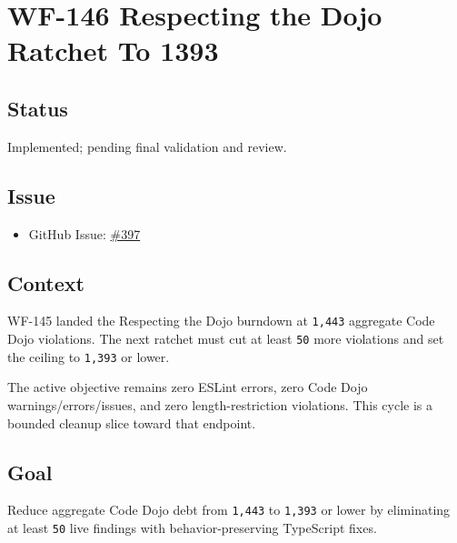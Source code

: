 \chapter{WF-146 Respecting the Dojo Ratchet To 1393}\label{record-228}

\smallskip

\section{Status}\label{record-228-status}

Implemented; pending final validation and review.

\section{Issue}\label{record-228-issue}

\begin{itemize}
\tightlist
\item
  GitHub Issue: \href{https://github.com/flyingrobots/bijou/issues/397}{\#397}
\end{itemize}

\section{Context}\label{record-228-context}

WF-145 landed the Respecting the Dojo burndown at \texttt{1\allowbreak{},\allowbreak{}4\allowbreak{}4\allowbreak{}3} aggregate Code Dojo violations. The next ratchet must cut at least \texttt{5\allowbreak{}0} more violations and set the ceiling to \texttt{1\allowbreak{},\allowbreak{}3\allowbreak{}9\allowbreak{}3} or lower.

The active objective remains zero ESLint errors, zero Code Dojo warnings/errors/issues, and zero length-restriction violations. This cycle is a bounded cleanup slice toward that endpoint.

\section{Goal}\label{record-228-goal}

Reduce aggregate Code Dojo debt from \texttt{1\allowbreak{},\allowbreak{}4\allowbreak{}4\allowbreak{}3} to \texttt{1\allowbreak{},\allowbreak{}3\allowbreak{}9\allowbreak{}3} or lower by eliminating at least \texttt{5\allowbreak{}0} live findings with behavior-preserving TypeScript fixes.

